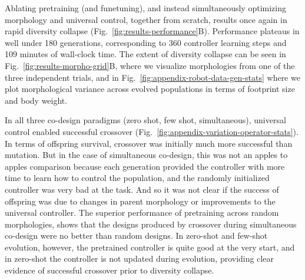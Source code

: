 Ablating pretraining (and funetuning),
and instead simultaneously optimizing morphology and universal control, together from scratch, 
results once again in rapid diversity collapse (Fig.~\ref{fig:results-performance}B).
Performance plateaus in well under 180 generations, corresponding to 360 controller learning steps and 109 minutes of wall-clock time.
% 
The extent of diversity collapse can be seen in Fig.~\ref{fig:results-morpho-grid}B, where we visualize morphologies from one of the three independent trials,
and in Fig.~\ref{fig:appendix-robot-data-gen-stats} where we plot morphological variance across evolved populations in terms of footprint size and body weight.

In all three co-design paradigms (zero shot, few shot, simultaneous), universal control enabled successful crossover (Fig.~\ref{fig:appendix-variation-operator-stats}).
In terms of offspring survival,
crossover was initially much more successful than mutation.
But in the case of simultaneous co-design, this was not an apples to apples comparison because each generation provided the controller with more time to learn how to control the population, and the randomly initialized controller was very bad at the task.
And so it was not clear if the success of offspring was due to changes in parent morphology or improvements to the universal controller.
The superior performance of pretraining across random morphologies, shows that the designs produced by crossover during simultaneous co-design were no better than random designs. 
In zero-shot and few-shot evolution, however, the pretrained controller is quite good at the very start, and in zero-shot the controller is not updated during evolution, providing clear evidence of successful crossover prior to diversity collapse.


